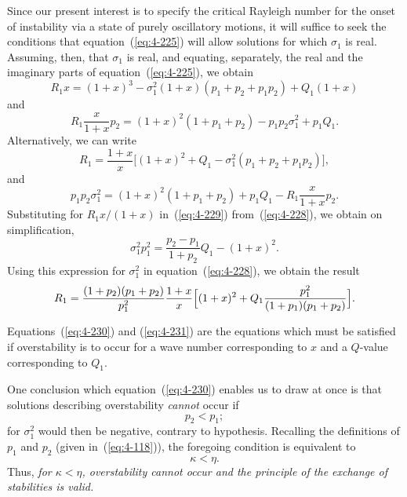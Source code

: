 Since our present interest is to specify the critical Rayleigh number for the onset of instability via a state of purely oscillatory motions, it will suffice to seek the conditions that equation~(\ref{eq:4-225}) will allow solutions for which $\sigma_1$ is real. Assuming, then, that $\sigma_1$ is real, and equating, separately, the real and the imaginary parts of equation~(\ref{eq:4-225}), we obtain
\begin{equation}
\label{eq:4-226}
R_1 x = (1+x)^3-\sigma_1^2(1+x)(p_1+p_2+p_1 p_2)+Q_1(1+x)
\end{equation}
and
\begin{equation}
\label{eq:4-227}
R_1\frac{x}{1+x}p_2 = (1+x)^2(1+p_1+p_2)-p_1 p_2\sigma_1^2+p_1 Q_1.
\end{equation}
Alternatively, we can write
\begin{equation}
\label{eq:4-228}
R_1 = \frac{1+x}{x}\bigl[(1+x)^2+Q_1-\sigma_1^2(p_1+p_2+p_1 p_2)\bigr],
\end{equation}
and
\begin{equation}
\label{eq:4-229}
p_1 p_2\sigma_1^2 = (1+x)^2(1+p_1+p_2)+p_1 Q_1 - R_1\frac{x}{1+x}p_2.
\end{equation}
Substituting for $R_1 x/(1+x)$ in~(\ref{eq:4-229}) from~(\ref{eq:4-228}), we obtain on simplification,
\begin{equation}
\label{eq:4-230}
\sigma_1^2 p_1^2 = \frac{p_2-p_1}{1+p_2}Q_1-(1+x)^2.
\end{equation}
Using this expression for $\sigma_1^2$ in equation~(\ref{eq:4-228}), we obtain the result
\begin{equation}
\label{eq:4-231}
R_1 = \frac{(1+p_2)(p_1+p_2)}{p_1^2}\frac{1+x}{x}\Bigl[(1+x)^2+Q_1\frac{p_1^2}{(1+p_1)(p_1+p_2)}\Bigr].
\end{equation}

Equations~(\ref{eq:4-230}) and (\ref{eq:4-231}) are the equations which must be satisfied if overstability is to occur for a wave number corresponding to $x$ and a $Q$-value corresponding to $Q_1$.

One conclusion which equation~(\ref{eq:4-230}) enables us to draw at once is that solutions describing overstability \emph{cannot} occur if
\begin{equation}
\label{eq:4-232}
p_2 < p_1;
\end{equation}
for $\sigma_1^2$ would then be negative, contrary to hypothesis. Recalling the definitions of $p_1$ and $p_2$ (given in~(\ref{eq:4-118})), the foregoing condition is equivalent to
\begin{equation}
\label{eq:4-233}
\kappa < \eta.
\end{equation}
Thus, \emph{for $\kappa<\eta$, overstability cannot occur and the principle of the exchange of stabilities is valid.}

